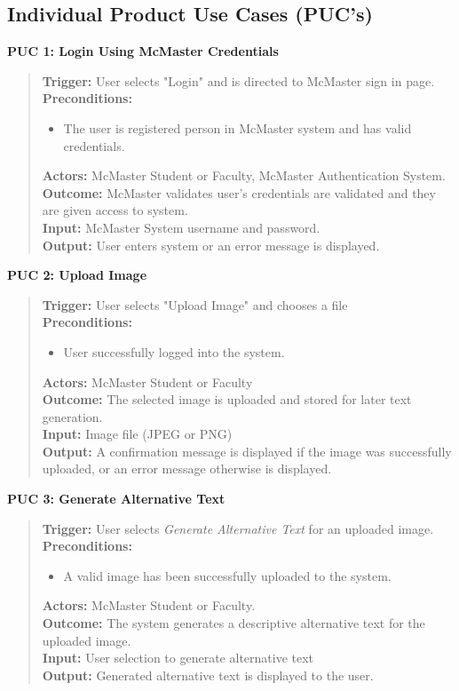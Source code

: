 \documentclass[12pt]{article}
\begin{document}
\subsection{Individual Product Use Cases (PUC's)}
\textbf{PUC 1: Login Using McMaster Credentials } 
\begin{quote}
\textbf{Trigger:} User selects "Login" and is directed to McMaster sign in page.\\
\textbf{Preconditions:}
\begin{itemize}
  \item The user is registered person in McMaster system and has valid credentials.
\end{itemize}
\textbf{Actors:} McMaster Student or Faculty, McMaster Authentication System.\\
\textbf{Outcome:} McMaster validates user's credentials are validated and they are given access to system.\\
\textbf{Input:} McMaster System username and password. \\
\textbf{Output:} User enters system or an error message is displayed.
\end{quote}
\textbf{PUC 2: Upload Image }
\begin{quote}
\textbf{Trigger:} User selects "Upload Image" and chooses a file\\
\textbf{Preconditions:}
\begin{itemize}
  \item User successfully logged into the system.
\end{itemize}
\textbf{Actors:} McMaster Student or Faculty \\
\textbf{Outcome:} The selected image is uploaded and stored for later text generation.\\
\textbf{Input:} Image file (JPEG or PNG) \\
\textbf{Output:} A confirmation message is displayed if the image was successfully uploaded, or an error message otherwise is displayed.
\end{quote}
\textbf{PUC 3: Generate Alternative Text}
\begin{quote}
\textbf{Trigger:} User selects \textit{Generate Alternative Text} for an uploaded image.\\
\textbf{Preconditions:}
\begin{itemize}
  \item A valid image has been successfully uploaded to the system. 
\end{itemize}
\textbf{Actors:} McMaster Student or Faculty.\\
\textbf{Outcome:} The system generates a descriptive alternative text for the uploaded image.\\
\textbf{Input:} User selection to generate alternative text\\
\textbf{Output:} Generated alternative text is displayed to the user.
\end{quote}
\end{document}
